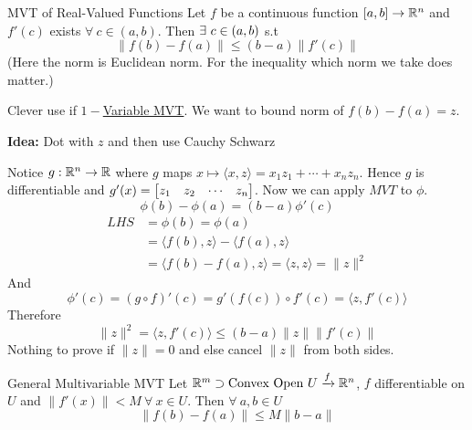 \begin{theorem}{MVT of Real-Valued Functions}{}
	Let $f$ be a continuous function $[a,b]\to \mathbb{R}^n$ and $f'(c)$ exists $\forall\ c\in(a,b)$. Then $\exists\ c\in (a,b)$ s.t $$\|f(b)-f(a)\|\leq (b-a)\|f'(c)\|$$(Here the norm is Euclidean norm. For the inequality which norm we take does matter.)
\end{theorem}
\begin{myproof}
	Clever use if \hyperref[th:1varmvt]{$1-$Variable MVT}. We want to bound norm of $f(b)-f(a)=z$.\parinf

	\textbf{Idea: }Dot with $z$ and then use Cauchy Schwarz \parinn
	\begin{center}
	\end{center}
	Notice $g: \mathbb{R}^n\to\mathbb{R}$ where $g$ maps $x\longmapsto \langle x,z\rangle=x_1z_1+\cdots+x_nz_n$. Hence $g$ is differentiable and $g'(x)=\left[ \begin{matrix} z_1 & z_2 & \cdots & z_n\end{matrix}\right]$. Now we can apply $MVT$ to $\phi$. $$\phi(b)-\phi(a)=(b-a)\phi'(c)$$\begin{align*}
		LHS & =\phi(b)=\phi(a)                                       \\
		    & =\langle f(b),z\rangle -\langle f(a),z\rangle          \\
		    & =\langle f(b)-f(a),z\rangle=\langle z,z\rangle=\|z\|^2
	\end{align*}And$$\phi'(c)=(g\circ f)'(c)=g'(f(c))\circ f'(c)=\langle z ,f'(c)\rangle$$Therefore$$\|z\|^2=\langle z,f'(c)\rangle\leq (b-a)\|z\|\|f'(c)\|$$Nothing to prove if $\|z\|=0$ and else cancel $\|z\|$ from both sides.
\end{myproof}
\begin{theorem}{General Multivariable MVT}{}
	Let $\mathbb{R}^m\supset \text{Convex Open }U\xrightarrow{f}\mathbb{R}^n$, $ f$ differentiable on $U$ and $ \|f'(x)\|<M \ \forall\ x\in U$. Then $\forall\ a,b\in U$ $$\|f(b)-f(a)\|\leq M\|b-a\|$$
\end{theorem}
